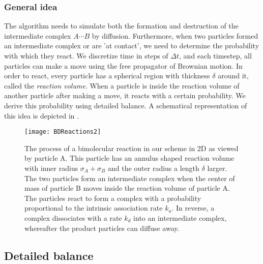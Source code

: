 \subsubsection{General idea}
The algorithm needs to simulate both the formation and destruction of the intermediate complex $A\cdots B$ by diffusion. Furthermore, when two particles formed an intermediate complex or are 'at contact', we need to determine the probability with which they react. We discretize time in steps of $\Delta t$, and each timestep, all particles can make a move using the free propagator of Brownian motion. In order to react, every particle has a spherical region with thickness $\delta$ around it, called the \emph{reaction volume}. When a particle is inside the reaction volume of another particle after making a move, it reacts with a certain probability. We derive this probability using detailed balance. A schematical representation of this idea is depicted in .

\begin{figure}[ht]
\centering
\texttt{[image: BDReactions2]}
\caption{ The process of a bimolecular reaction in our scheme in 2D as viewed by particle A. This particle has an annulus shaped reaction volume with inner radius $\sigma_A + \sigma_B$ and the outer radius a length $\delta$ larger. The two particles form an intermediate complex when the center of mass of particle B moves inside the reaction volume of particle A. The particles react to form a complex with a probability proportional to the intrinsic association rate $k_a$. In reverse, a complex dissociates with a rate $k_d$ into an intermediate complex, whereafter the product particles can diffuse away.}
\end{figure}
 
\subsection{Detailed balance}

